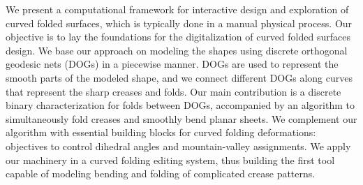 We present a computational framework for interactive design and exploration of curved folded surfaces, which is typically done in a manual physical process. Our objective is to lay the foundations for the digitalization of curved folded surfaces design.
We base our approach on modeling the shapes using discrete orthogonal geodesic nets (DOGs) in a piecewise manner. DOGs are used to represent the smooth parts of the modeled shape, and we connect different DOGs along curves that represent the sharp creases and folds. 
Our main 
contribution is a discrete binary characterization for folds between DOGs, accompanied by an algorithm to simultaneously fold creases and smoothly bend planar sheets. We complement our algorithm with essential building blocks for curved folding deformations: objectives to control dihedral angles and mountain-valley assignments. We apply our machinery in a curved folding editing system, thus building the first tool capable of modeling bending and folding of complicated crease patterns.

